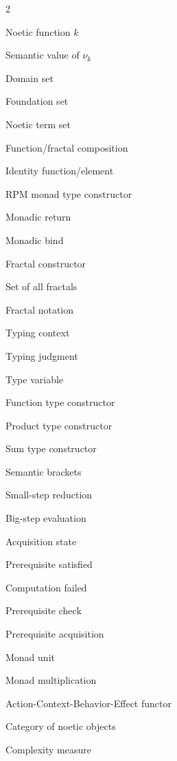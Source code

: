 \documentclass[11pt,twoside,openright]{book}
\theoremstyle{definition}
\theoremstyle{plain}
\theoremstyle{remark}
\newcommand{\noe}[1]{\nu_{#1}}
\newcommand{\RPM}{\mathfrak{R}}
\newcommand{\rpmret}{\mathsf{return}}
\newcommand{\rpmbind}{\mathbin{\gg\!=}}
\newcommand{\Frac}{\Phi}
\newcommand{\FracSet}{\mathbf{Frac}}
\newcommand{\id}{\mathrm{id}}
\newcommand{\smallstep}{\to}
\newcommand{\bigstep}{\Downarrow}
\newcommand{\Satisfied}{\mathsf{Sat}}
\newcommand{\Failed}{\mathsf{Fail}}
\begin{document}
\begin{multicols}{2}
\begin{description}[leftmargin=2em,labelindent=0em]
\item[$\noe{k}$] Noetic function $k$
\item[$\mathfrak{n}_k$] Semantic value of $\noe{k}$
\item[$\Dom$] Domain set
\item[$\Fund$] Foundation set
\item[$\NoeTerm$] Noetic term set
\item[$\circ$] Function/fractal composition
\item[$\id$] Identity function/element
\item[$\RPM$] RPM monad type constructor
\item[$\rpmret$] Monadic return
\item[$\rpmbind$] Monadic bind
\item[$\Frac$] Fractal constructor
\item[$\FracSet$] Set of all fractals
\item[$\langle k_1 : \cdots : k_n \rangle$] Fractal notation
\item[$\Gamma$] Typing context
\item[$\vdash$] Typing judgment
\item[$\tau$] Type variable
\item[$\to$] Function type constructor
\item[$\times$] Product type constructor
\item[$+$] Sum type constructor
\item[$\llbracket \cdot \rrbracket$] Semantic brackets
\item[$\smallstep$] Small-step reduction
\item[$\bigstep$] Big-step evaluation
\item[$\alpha$] Acquisition state
\item[$\Satisfied$] Prerequisite satisfied
\item[$\Failed$] Computation failed
\item[$\mathsf{check}$] Prerequisite check
\item[$\mathsf{acquire}$] Prerequisite acquisition
\item[$\eta$] Monad unit
\item[$\mu$] Monad multiplication
\item[$\text{ACBE}$] Action-Context-Behavior-Effect functor
\item[$\mathbf{Noetica}$] Category of noetic objects
\item[$\mathcal{M}$] Complexity measure
\end{description}
\end{multicols}
\end{document}
